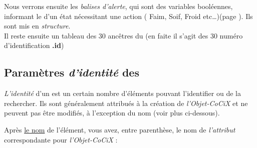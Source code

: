 \documentclass[french]{report}
\newlength{\du}\fi
\begin{document}
Nous verrons ensuite les \textit{balises d'alerte}, qui sont des variables booléennes, informant  le \CoCiX d'un état nécessitant une action ( Faim, Soif, Froid etc\dots)(page \pageref{balise}). Ils sont mis en \textit{structure}.\\
Il reste ensuite un tableau des 30 ancêtres du \CoCiX (en faite il s'agit des 30 numéro d'identification \textbf{.id})

\newpage

\subsection{Paramètres \textit{d'identité} des \CoCiX}\label{identite}

\textit{L'identité} d'un \CoCiX est un certain nombre d'éléments pouvant l'identifier ou de la rechercher. Ils sont généralement attribués à la création de \textit{l'Objet-CoCiX} et ne peuvent pas être modifiés, à l'exception du nom (voir plus ci-dessous).\par

Après \underline{le nom} de l'élément, vous avez, entre parenthèse, le nom de \textit{l'attribut} correspondante pour \textit{l'Objet-CoCiX} :\\
\end{document}
